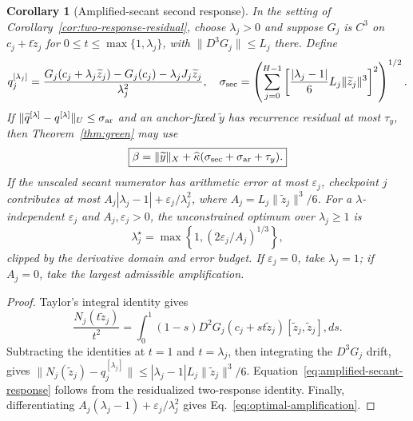 \documentclass{article}
\newtheorem{corollary}{Corollary}
\begin{document}
\begin{corollary}[Amplified-secant second response]
\label{cor:amplified-secant}
In the setting of Corollary~\ref{cor:two-response-residual}, choose
$\lambda_j>0$ and suppose $G_j$ is $C^3$ on
$c_j+t\widetilde z_j$ for
$0\le t\le\max\{1,\lambda_j\}$, with
$\|D^3G_j\|\le L_j$ there.  Define
\begin{equation}
 q_j^{[\lambda_j]}=
 \frac{G_j(c_j+\lambda_j\widetilde z_j)-G_j(c_j)
       -\lambda_jJ_j\widetilde z_j}{\lambda_j^2},
 \quad
 \sigma_{\rm sec}=
 \left(\sum_{j=0}^{H-1}
 \left[\frac{|\lambda_j-1|}{6}L_j
 \|\widetilde z_j\|^3\right]^2\right)^{1/2}.
 \label{eq:amplified-secant}
\end{equation}
If $\|\widetilde q^{[\lambda]}-q^{[\lambda]}\|_U\le\sigma_{\rm ar}$
and an anchor-fixed $\widetilde y$ has recurrence residual at most $\tau_y$,
then Theorem~\ref{thm:green} may use
\begin{equation}
 \boxed{\beta=\|\widetilde y\|_X+
 \widehat\kappa(\sigma_{\rm sec}+\sigma_{\rm ar}+\tau_y).}
 \label{eq:amplified-secant-response}
\end{equation}
If the unscaled secant numerator has arithmetic error at most $\varepsilon_j$,
checkpoint $j$ contributes at most
$A_j|\lambda_j-1|+\varepsilon_j/\lambda_j^2$, where
$A_j=L_j\|\widetilde z_j\|^3/6$.  For a $\lambda$-independent
$\varepsilon_j$ and $A_j,\varepsilon_j>0$, the unconstrained optimum over
$\lambda_j\ge1$ is
\begin{equation}
 \lambda_j^\star=
 \max\left\{1,(2\varepsilon_j/A_j)^{1/3}\right\},
 \label{eq:optimal-amplification}
\end{equation}
clipped by the derivative domain and error budget.
If $\varepsilon_j=0$, take $\lambda_j=1$; if $A_j=0$, take the largest
admissible amplification.
\end{corollary}

\begin{proof}
Taylor's integral identity gives
\begin{equation}
 \frac{N_j(t\widetilde z_j)}{t^2}
 =\int_0^1(1-s)D^2G_j(c_j+st\widetilde z_j)
 [\widetilde z_j,\widetilde z_j],ds.
\end{equation}
Subtracting the identities at $t=1$ and $t=\lambda_j$, then integrating the
$D^3G_j$ drift, gives
$\|N_j(\widetilde z_j)-q_j^{[\lambda_j]}\|
\le|\lambda_j-1|L_j\|\widetilde z_j\|^3/6$.
Equation~\eqref{eq:amplified-secant-response} follows from the residualized
two-response identity.  Finally, differentiating
$A_j(\lambda_j-1)+\varepsilon_j/\lambda_j^2$ gives
Eq.~\eqref{eq:optimal-amplification}.
\end{proof}
\end{document}
